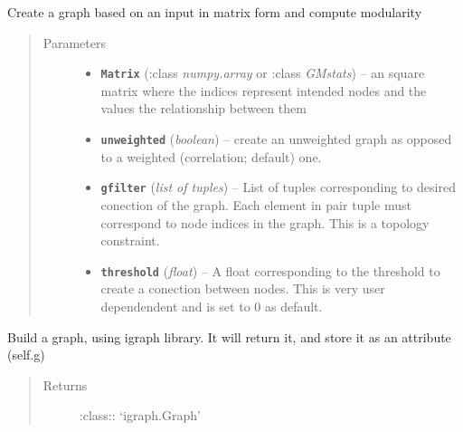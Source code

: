 \documentclass[letterpaper,10pt,english]{sphinxmanual}
\begin{document}
\begin{fulllineitems}
\label{Doc:Moduler.GMgraph}
Create a graph based on an input in matrix form and compute modularity
\begin{quote}\begin{description}
\item[{Parameters}] \leavevmode\begin{itemize}
\item {} 
\textbf{\texttt{Matrix}} (:class \emph{numpy.array} or :class \emph{GMstats}) -- an square matrix where the indices represent intended nodes and the values the relationship between them

\item {} 
\textbf{\texttt{unweighted}} (\emph{boolean}) -- create an unweighted graph as opposed to a weighted (correlation; default) one.

\item {} 
\textbf{\texttt{gfilter}} (\emph{list of tuples}) -- List of tuples corresponding to desired conection of the graph. Each element in pair tuple must correspond to node indices in the graph. This is a topology constraint.

\item {} 
\textbf{\texttt{threshold}} (\emph{float}) -- A float corresponding to the threshold to create a conection between nodes. This is very user dependendent and is set to 0 as default.

\end{itemize}

\end{description}\end{quote}

\begin{fulllineitems}
\label{Doc:Moduler.GMgraph.Build_igraph}
Build a graph, using igraph library. It will return it, and store it as an attribute (self.g)
\begin{quote}\begin{description}
\item[{Returns}] \leavevmode
:class:: `igraph.Graph'

\end{description}\end{quote}


\end{fulllineitems}
\end{fulllineitems}
\end{document}
